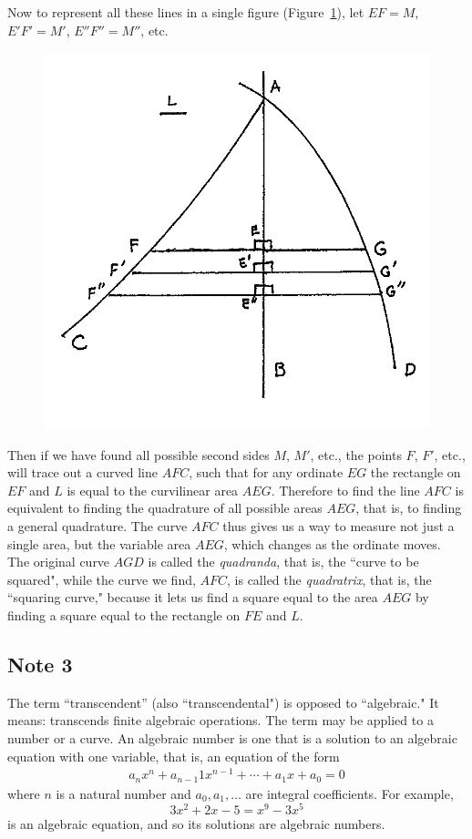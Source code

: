 \documentclass[polutonikogreek,english,twoside,openright]{article}
\begin{document}
Now to represent all these lines in a single figure
(Figure~\ref{quadratrix}), let $EF = M$, $E'F' = M'$, $E''F'' = M''$,
etc.
\begin{figure}[htp]
\begin{center}
\includegraphics[width=.75\textwidth]{fig/Figure29C}
\caption{}
\label{quadratrix}
\vspace{-10pt}
\end{center}
\end{figure} 
Then if we have found all possible second sides $M$, $M'$, etc., the
points $F$, $F'$, etc., will trace out a curved line $AFC$, such that
for any ordinate $EG$ the rectangle on $EF$ and $L$ is equal to the
curvilinear area $AEG$.  Therefore to find the line $AFC$ is
equivalent to finding the quadrature of all possible areas $AEG$, that
is, to finding a general quadrature.  The curve $AFC$ thus gives us a
way to measure not just a single area, but the variable area $AEG$,
which changes as the ordinate moves.  The original curve $AGD$ is
called the {\em quadranda}, that is, the ``curve to be squared", while
the curve we find, $AFC$, is called the {\em
  quadratrix}\label{quaddef}, that is, the ``squaring curve," because
it lets us find a square equal to the area $AEG$ by finding a square
equal to the rectangle on $FE$ and $L$.

\subsection*{Note 3}
\label{crg3}
The term ``transcendent'' (also ``transcendental") is opposed to
``algebraic." It means: transcends finite algebraic operations. The
term may be applied to a number or a curve. An algebraic
number is one that is a solution to an algebraic equation with one
variable, that is, an equation of the form
\begin{align*}
a_{n}x^n+a_{n-1}1x^{n-1}+\cdots+a_1x+a_0=0
\end{align*}
where $n$ is a natural number and $a_0, a_1, \dotsc$ are integral coefficients.
For example,
$$3x^2 + 2x -5  = x^9 - 3x^5$$
is an algebraic equation, and so its solutions are algebraic numbers.
\end{document}
